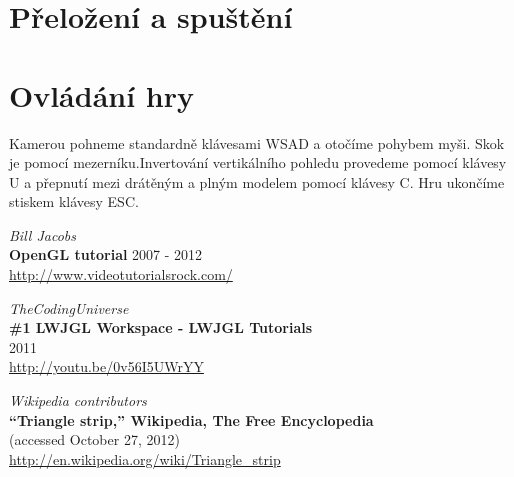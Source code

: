 \documentclass[11pt]{article}
\begin{document}
\section{Přeložení a spuštění}
\section{Ovládání hry}
Kamerou pohneme standardně klávesami WSAD a otočíme pohybem myši. Skok je
pomocí mezerníku.Invertování vertikálního pohledu provedeme pomocí klávesy U a
přepnutí mezi drátěným a plným modelem pomocí klávesy C. Hru ukončíme stiskem
klávesy ESC.


\begin{thebibliography}{3}
{\em Bill Jacobs} \\
{\bf OpenGL tutorial}
	2007 - 2012 \\
\url{http://www.videotutorialsrock.com/}

{\em TheCodingUniverse} \\
{\bf \#1 LWJGL Workspace - LWJGL Tutorials} \\
	2011 \\
\url{http://youtu.be/0v56I5UWrYY}

{\em Wikipedia contributors} \\
{\bf ``Triangle strip,'' Wikipedia, The Free Encyclopedia} \\
	(accessed October 27, 2012) \\
\url{http://en.wikipedia.org/wiki/Triangle_strip}


\end{thebibliography}
\end{document}
